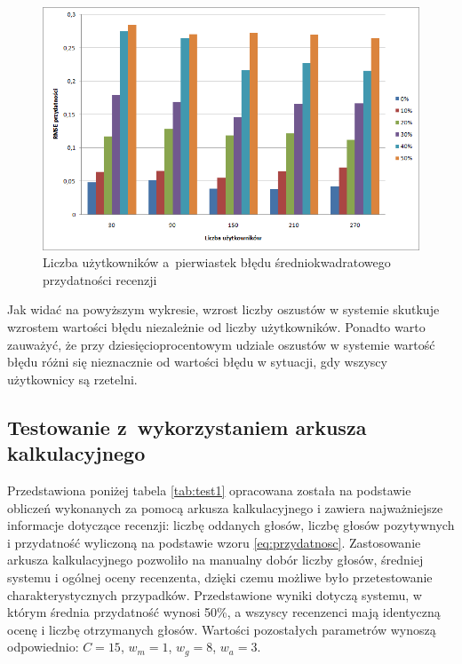 \begin{figure}[h]
	\centering
	\includegraphics[width=\textwidth, keepaspectratio=true]{images/LiarsTest.png}
	\caption{Liczba użytkowników a~pierwiastek błędu średniokwadratowego przydatności recenzji}\label{fig:test3}
\end{figure}

Jak widać na powyższym wykresie, wzrost liczby oszustów w systemie skutkuje wzrostem wartości błędu niezależnie od liczby użytkowników. Ponadto warto zauważyć, że przy dziesięcioprocentowym udziale oszustów w systemie wartość błędu różni się nieznacznie od wartości błędu w sytuacji, gdy wszyscy użytkownicy są rzetelni.

\subsection{Testowanie z~wykorzystaniem arkusza kalkulacyjnego}

Przedstawiona poniżej tabela \ref{tab:test1} opracowana została na podstawie obliczeń wykonanych za pomocą arkusza kalkulacyjnego i zawiera najważniejsze informacje dotyczące recenzji: liczbę oddanych głosów, liczbę głosów pozytywnych i przydatność wyliczoną na podstawie wzoru \ref{eq:przydatnosc}. Zastosowanie arkusza kalkulacyjnego pozwoliło na manualny dobór liczby głosów, średniej systemu i ogólnej oceny recenzenta, dzięki czemu możliwe było przetestowanie charakterystycznych przypadków. Przedstawione wyniki dotyczą systemu, w którym średnia przydatność wynosi 50\%, a wszyscy recenzenci mają identyczną ocenę i liczbę otrzymanych głosów. Wartości pozostałych parametrów wynoszą odpowiednio: $C=15$, $w_{m}=1$, $w_{g}=8$, $w_{a}=3$.

